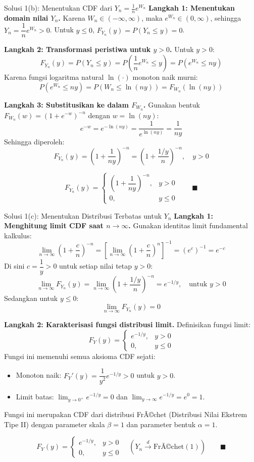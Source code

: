 \documentclass[10pt,twoside]{article}
\begin{document}
\begin{solbox}{Solusi 1(b): Menentukan CDF dari $Y_n = \frac{1}{n} e^{W_n}$}
\textbf{Langkah 1: Menentukan domain nilai $Y_n$.}
Karena $W_n \in (-\infty, \infty)$, maka $e^{W_n} \in (0, \infty)$, sehingga $Y_n = \dfrac{1}{n} e^{W_n} > 0$.
Untuk $y \le 0$, $F_{Y_n}(y) = P(Y_n \le y) = 0$.

\textbf{Langkah 2: Transformasi peristiwa untuk $y > 0$.}
Untuk $y > 0$:
\[
F_{Y_n}(y) = P(Y_n \le y) = P\left(\frac{1}{n} e^{W_n} \le y\right) = P\left(e^{W_n} \le ny\right)
\]
Karena fungsi logaritma natural $\ln(\cdot)$ monoton naik murni:
\[
P\left(e^{W_n} \le ny\right) = P\left(W_n \le \ln(ny)\right) = F_{W_n}(\ln(ny))
\]

\textbf{Langkah 3: Substitusikan ke dalam $F_{W_n}$.}
Gunakan bentuk $F_{W_n}(w) = (1 + e^{-w})^{-n}$ dengan $w = \ln(ny)$:
\[
e^{-w} = e^{-\ln(ny)} = \frac{1}{e^{\ln(ny)}} = \frac{1}{ny}
\]
Sehingga diperoleh:
\[
F_{Y_n}(y) = \left(1 + \frac{1}{ny}\right)^{-n} = \left(1 + \frac{1/y}{n}\right)^{-n}, \quad y > 0
\]

\[
\boxed{F_{Y_n}(y) = \begin{cases} \left(1 + \dfrac{1}{ny}\right)^{-n}, & y > 0 \\ 0, & y \le 0 \end{cases}} \qquad \blacksquare
\]
\end{solbox}

\begin{solbox}{Solusi 1(c): Menentukan Distribusi Terbatas untuk $Y_n$}
\textbf{Langkah 1: Menghitung limit CDF saat $n \to \infty$.}
Gunakan identitas limit fundamental kalkulus:
\[
\lim_{n \to \infty} \left(1 + \frac{c}{n}\right)^{-n} = \left[\lim_{n \to \infty} \left(1 + \frac{c}{n}\right)^n\right]^{-1} = (e^c)^{-1} = e^{-c}
\]
Di sini $c = \dfrac{1}{y} > 0$ untuk setiap nilai tetap $y > 0$:
\[
\lim_{n \to \infty} F_{Y_n}(y) = \lim_{n \to \infty} \left(1 + \frac{1/y}{n}\right)^{-n} = e^{-1/y}, \quad \text{untuk } y > 0
\]
Sedangkan untuk $y \le 0$:
\[
\lim_{n \to \infty} F_{Y_n}(y) = 0
\]

\textbf{Langkah 2: Karakterisasi fungsi distribusi limit.}
Definisikan fungsi limit:
\[
F_Y(y) = \begin{cases} e^{-1/y}, & y > 0 \\ 0, & y \le 0 \end{cases}
\]
Fungsi ini memenuhi semua aksioma CDF sejati:
\begin{itemize}
  \item Monoton naik: $F_Y'(y) = \dfrac{1}{y^2} e^{-1/y} > 0$ untuk $y > 0$.
  \item Limit batas: $\lim_{y \to 0^+} e^{-1/y} = 0$ dan $\lim_{y \to \infty} e^{-1/y} = e^0 = 1$.
\end{itemize}
Fungsi ini merupakan CDF dari distribusi FrÃ©chet (Distribusi Nilai Ekstrem Tipe II) dengan parameter skala $\beta = 1$ dan parameter bentuk $\alpha = 1$.

\[
\boxed{F_Y(y) = \begin{cases} e^{-1/y}, & y > 0 \\ 0, & y \le 0 \end{cases} \quad \left(Y_n \xrightarrow{d} \text{FrÃ©chet}(1)\right)} \qquad \blacksquare
\]
\end{solbox}
\end{document}
